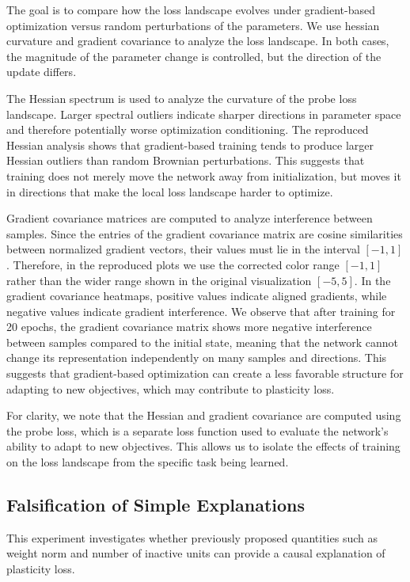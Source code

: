 The goal is to compare how the loss landscape evolves under gradient-based optimization versus random perturbations of the parameters. We use hessian curvature and gradient covariance to analyze the loss landscape. In both cases, the magnitude of the parameter change is controlled, but the direction of the update differs.

The Hessian spectrum is used to analyze the curvature of the probe loss landscape. Larger spectral outliers indicate sharper directions in parameter space and therefore potentially worse optimization conditioning. The reproduced Hessian analysis shows that gradient-based training tends to produce larger Hessian outliers than random Brownian perturbations. This suggests that training does not merely move the network away from initialization, but moves it in directions that make the local loss landscape harder to optimize.

Gradient covariance matrices are computed to analyze interference between samples.
Since the entries of the gradient covariance matrix are cosine similarities between normalized gradient vectors, their values must lie in the interval $[-1,1]$. Therefore, in the reproduced plots we use the corrected color range $[-1,1]$ rather than the wider range shown in the original visualization $[-5, 5]$.
In the gradient covariance heatmaps, positive values indicate aligned gradients, while negative values indicate gradient interference. We observe that after training for 20 epochs, the gradient covariance matrix shows more negative interference between samples compared to the initial state, meaning that the network cannot change its representation independently on many samples and directions. This suggests that gradient-based optimization can create a less favorable structure for adapting to new objectives, which may contribute to plasticity loss.

For clarity, we note that the Hessian and gradient covariance are computed using the probe loss, which is a separate loss function used to evaluate the network's ability to adapt to new objectives. This allows us to isolate the effects of training on the loss landscape from the specific task being learned.



\subsection{Falsification of Simple Explanations}

This experiment investigates whether previously proposed quantities such as weight norm and number of inactive units can provide a causal explanation of plasticity loss.

